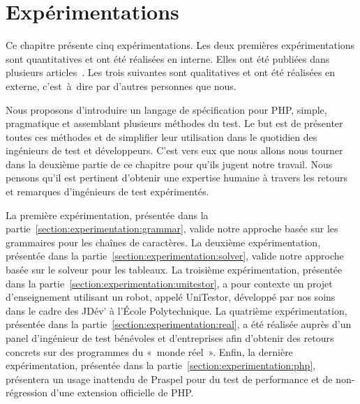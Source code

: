 \chapter{Expérimentations}
\label{chapter:experimentations}

\mminitoc

Ce chapitre présente cinq expérimentations. Les deux premières expérimentations
sont {\strong quantitatives} et ont été réalisées en interne. Elles ont été
publiées dans plusieurs articles~. Les trois suivantes sont {\strong qualitatives} et ont été
réalisées en externe, c'est~à~dire par d'autres personnes que nous.

Nous proposons d'introduire un langage de spécification pour PHP, simple,
pragmatique et assemblant plusieurs méthodes du test. Le but est de présenter
toutes ces méthodes et de simplifier leur utilisation dans le quotidien des
ingénieurs de test et développeurs. C'est vers eux que nous allons nous tourner
dans la deuxième partie de ce chapitre pour qu'ils jugent notre travail. Nous
pensons qu'il est pertinent d'obtenir une expertise humaine à travers les
retours et remarques d'ingénieurs de test expérimentés.

La première expérimentation, présentée dans la
partie~\ref{section:experimentation:grammar}, valide notre approche basée sur
les grammaires pour les chaînes de caractères. La deuxième expérimentation,
présentée dans la partie~\ref{section:experimentation:solver}, valide notre
approche basée sur le solveur pour les tableaux. La troisième expérimentation,
présentée dans la partie~\ref{section:experimentation:unitestor}, a pour
contexte un projet d'enseignement utilisant un robot, appelé UniTestor,
développé par nos soins dans le cadre des JDév' à l'École Polytechnique. La
quatrième expérimentation, présentée dans la
partie~\ref{section:experimentation:real}, a été réalisée auprès d'un panel
d'ingénieur de test bénévoles et d'entreprises afin d'obtenir des retours
concrets sur des programmes du «~monde réel~». Enfin, la dernière
expérimentation, présentée dans la partie~\ref{section:experimentation:php},
présentera un usage inattendu de Praspel pour du test de performance et de
non-régression d'une extension officielle de PHP.

